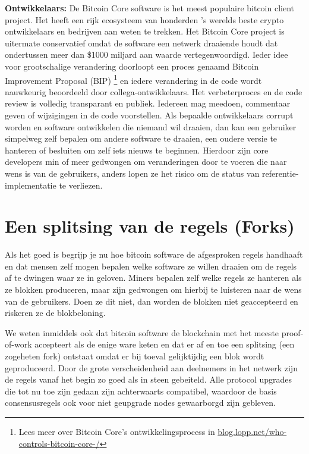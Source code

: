 \noindent\textbf{Ontwikkelaars:}
De Bitcoin Core software is het meest populaire bitcoin client project. Het heeft een rijk ecosysteem van honderden 's werelds beste crypto ontwikkelaars en bedrijven aan weten te trekken. Het Bitcoin Core project is uitermate conservatief omdat de software een netwerk draaiende houdt dat ondertussen meer dan \$1000 miljard aan waarde vertegenwoordigd. Ieder idee voor grootschalige verandering doorloopt een proces genaamd Bitcoin Improvement Proposal (BIP) \footnote{Lees meer over Bitcoin Core's ontwikkelingsprocess in \href{https://blog.lopp.net/who-controls-bitcoin-core-/}{blog.lopp.net/who-controls-bitcoin-core-/}} en iedere verandering in de code wordt nauwkeurig beoordeeld door collega-ontwikkelaars. Het verbeterproces en de code review is volledig transparant en publiek. Iedereen mag meedoen, commentaar geven of wijzigingen in de code voorstellen. Als bepaalde ontwikkelaars corrupt worden en software ontwikkelen die niemand wil draaien, dan kan een gebruiker simpelweg zelf bepalen om andere software te draaien, een oudere versie te hanteren of besluiten om zelf iets nieuws te beginnen. Hierdoor zijn core developers min of meer gedwongen om veranderingen door te voeren die naar wens is van de gebruikers, anders lopen ze het risico om de status van referentie-implementatie te verliezen. 

\section{Een splitsing van de regels (Forks)}

Als het goed is begrijp je nu hoe bitcoin software de afgesproken regels handhaaft en dat mensen zelf mogen bepalen welke software ze willen draaien om de regels af te dwingen waar ze in geloven. Miners bepalen zelf welke regels ze hanteren als ze blokken produceren, maar zijn gedwongen om hierbij te luisteren naar de wens van de gebruikers. Doen ze dit niet, dan worden de blokken niet geaccepteerd en riskeren ze de blokbeloning.

We weten inmiddels ook dat bitcoin software de blockchain met het meeste proof-of-work accepteert als de enige ware keten en dat er af en toe een splitsing (een zogeheten fork) ontstaat omdat er bij toeval gelijktijdig een blok wordt geproduceerd. Door de grote verscheidenheid aan deelnemers in het netwerk zijn de regels vanaf het begin zo goed als in steen gebeiteld. Alle protocol upgrades die tot nu toe zijn gedaan zijn achterwaarts compatibel, waardoor de basis consensusregels ook voor niet geupgrade nodes gewaarborgd zijn gebleven. 

